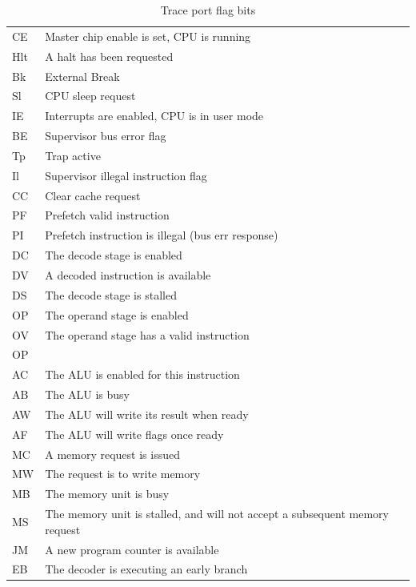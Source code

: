 \documentclass{gqtekspec}
\begin{document}
\begin{table}\begin{center}
\begin{tabular}{ll}\\\hline
CE & Master chip enable is set, CPU is running\\
Hlt & A halt has been requested\\
Bk & External Break\\
Sl & CPU sleep request\\
IE & Interrupts are enabled, CPU is in user mode \\
BE & Supervisor bus error flag\\
Tp & Trap active\\
Il & Supervisor illegal instruction flag\\
CC & Clear cache request\\
PF & Prefetch valid instruction\\
PI & Prefetch instruction is illegal (bus err response)\\
DC & The decode stage is enabled\\
DV & A decoded instruction is available\\
DS & The decode stage is stalled\\
OP & The operand stage is enabled\\
OV & The operand stage has a valid instruction\\
OP & \\	%
AC & The ALU is enabled for this instruction \\
AB & The ALU is busy\\
AW & The ALU will write its result when ready\\
AF & The ALU will write flags once ready\\
MC & A memory request is issued\\
MW & The request is to write memory\\
MB & The memory unit is busy\\
MS & The memory unit is stalled, and will not accept a subsequent memory
	request\\
JM & A new program counter is available\\
EB & The decoder is executing an early branch\\
\end{tabular}
\caption{Trace port flag bits}\label{tbl:traceport-flags}
\end{center}\end{table}
\end{document}
